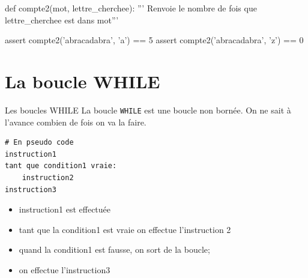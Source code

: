 \begin{exercice_cours}{}	
	
			\begin{CodePythontexAlt}[TaillePolice=\normalsize, Largeur=1\linewidth,Centre,PremLigne=1, Lignes=false,]{}
				def compte2(mot, lettre_cherchee):
					''' Renvoie le nombre de fois que lettre_cherchee est dans mot'''
					
	
	

					
	
	
	
		
				assert compte2('abracadabra', 'a') == 5
				assert compte2('abracadabra', 'z') == 0
				\end{CodePythontexAlt}
		\end{exercice_cours}
		
		\newpage
			\renewcommand{\arraystretch}{1}
		\section{La boucle WHILE}

		\begin{easybox}{Les boucles WHILE}
		La boucle \verb+WHILE+ est une boucle non bornée. On ne sait à l'avance combien de fois on va la faire.
	
		\medskip
	\begin{minipage}{0.4\linewidth}
	\begin{lstlisting}[numbers=none]
# En pseudo code
instruction1
tant que condition1 vraie:
	instruction2
instruction3
	\end{lstlisting}
		\end{minipage}\hfill
		\begin{minipage}{0.59\linewidth}
	\begin{itemize}
		\item instruction1 est effectuée
		\item tant que la condition1 est vraie on effectue l'instruction 2
		\item quand la condition1 est fausse, on sort de la boucle;
		\item on effectue l'instruction3
	\end{itemize}
		\end{minipage}	
	\end{easybox}
	

